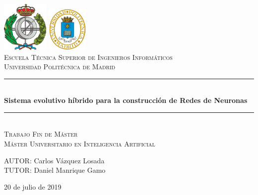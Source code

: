 \documentclass[spanish,a4paper,12pt,twoside]{report}
\begin{document}
  \begin{titlepage}
    \newcommand{\HRule}{\rule{\linewidth}{0.5mm}}
    \begin{center}
      \includegraphics[width = 2.25cm]{resources/FACINFO}
      \hspace{8cm}
      \includegraphics[width = 2cm]{resources/logoupm.png}
      \\[1cm]

      \textsc{\Large Escuela Técnica Superior de Ingenieros Informáticos}
      \\[0.5cm]
      \textsc{\large Universidad Politécnica de Madrid}
      \\[3cm]

      \HRule \\[0.4cm]
      {\huge \bfseries Sistema evolutivo híbrido para la construcción de Redes de Neuronas}
      \HRule \\[4cm]
    
      \textsc{\LARGE Trabajo Fin de Máster}\\[0.5cm]
      \textsc{\Large Máster Universitario en Inteligencia Artificial}\\[3cm]
    \end{center}
    \begin{flushright}
      \large AUTOR: Carlos Vázquez Losada \\TUTOR: Daniel Manrique Gamo
      \\[2.1cm]
    \end{flushright}
    \begin{center}
      {{20 de julio de 2019}}
    \end{center}
    \vfill
  \end{titlepage}
  \newpage\cleardoublepage
\end{document}
